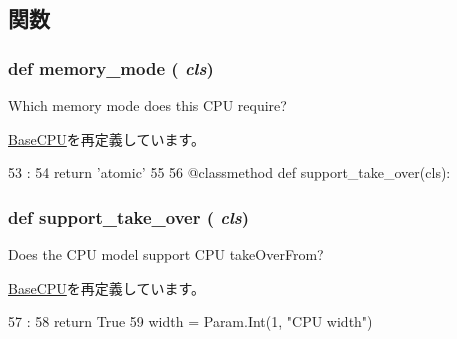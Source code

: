 \subsection{関数}
\hypertarget{classAtomicSimpleCPU_1_1AtomicSimpleCPU_a53d73a2f804df6a1dcabb22052d09773}{
\subsubsection[{memory\_\-mode}]{\setlength{\rightskip}{0pt plus 5cm}def memory\_\-mode ( {\em cls})}}
\label{classAtomicSimpleCPU_1_1AtomicSimpleCPU_a53d73a2f804df6a1dcabb22052d09773}
\begin{DoxyVerb}Which memory mode does this CPU require?\end{DoxyVerb}
 

\hyperlink{classBaseCPU_1_1BaseCPU_a53d73a2f804df6a1dcabb22052d09773}{BaseCPU}を再定義しています。


\begin{DoxyCode}
53                         :
54         return 'atomic'
55 
56     @classmethod
    def support_take_over(cls):
\end{DoxyCode}
\hypertarget{classAtomicSimpleCPU_1_1AtomicSimpleCPU_aa201537acf29724056129b8efad43371}{
\subsubsection[{support\_\-take\_\-over}]{\setlength{\rightskip}{0pt plus 5cm}def support\_\-take\_\-over ( {\em cls})}}
\label{classAtomicSimpleCPU_1_1AtomicSimpleCPU_aa201537acf29724056129b8efad43371}
\begin{DoxyVerb}Does the CPU model support CPU takeOverFrom?\end{DoxyVerb}
 

\hyperlink{classBaseCPU_1_1BaseCPU_aa201537acf29724056129b8efad43371}{BaseCPU}を再定義しています。


\begin{DoxyCode}
57                               :
58         return True
59 
    width = Param.Int(1, "CPU width")
\end{DoxyCode}


